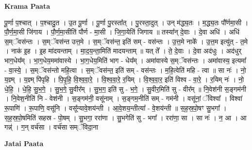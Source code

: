 \documentclass[17pt]{extarticle}
\begin{document}
\textbf{Krama Paata} \newline

पू॒र्णा प॒श्चात् । प॒श्चादु॒त । उ॒त पू॒र्णा । पू॒र्णा पु॒रस्ता᳚त् । पु॒रस्ता॒दुत् । उन् म॑द्ध्य॒तः । म॒द्ध्य॒तः पौ᳚र्णमा॒सी । पौ॒र्ण॒मा॒सी जि॑गाय । पौ॒र्ण॒मा॒सीति॑ पौर्ण - मा॒सी । जि॒गा॒येति॑ जिगाय ॥ तस्या᳚न् दे॒वाः । दे॒वा अधि॑ । अधि॑ स॒म्ॅवस॑न्तः । स॒म्ॅवस॑न्त उत्त॒मे । स॒म्ॅवस॑न्त॒ इति॑ सम् - वस॑न्तः । उ॒त्त॒मे नाके᳚ । उ॒त्त॒म इत्यु॑त् - त॒मे । नाक॑ इ॒ह । इ॒ह मा॑दयन्ताम् । मा॒द॒य॒न्ता॒मिति॑ मादयन्ताम् ॥ यत् ते᳚ । ते॒ दे॒वाः । दे॒वा अद॑धुः । अद॑धुर् भाग॒धेय᳚म् । भा॒ग॒धेय॒ममा॑वास्ये । भा॒ग॒धेय॒मिति॑ भाग - धेय᳚म् । अमा॑वास्ये स॒म्ॅवस॑न्तः । अमा॑वास्य॒ इत्यमा᳚ - वा॒स्ये॒ । स॒म्ॅवस॑न्तो महि॒त्वा । स॒म्ॅवस॑न्त॒ इति॑ सम् - वस॑न्तः । म॒हि॒त्वेति॑ महि - त्वा ॥ सा नः॑ । नो॒ य॒ज्ञ्म् । य॒ज्ञ्म् पि॑पृहि । पि॒पृ॒हि॒ वि॒श्व॒वा॒रे॒ । वि॒श्व॒वा॒रे॒ र॒यिम् । वि॒श्व॒वा॒र॒ इति॑ विश्व - वा॒रे॒ । र॒यिम् नः॑ । नो॒ धे॒हि॒ । धे॒हि॒ सु॒भ॒गे॒ । सु॒भ॒गे॒ सु॒वीर᳚म् । सु॒भ॒ग॒ इति॑ सु - भ॒गे॒ । सु॒वीर॒मिति॑ सु - वीर᳚म् ॥ नि॒वेश॑नी स॒ङ्गम॑नी । नि॒वेश॒नीति॑ नि - वेश॑नी । स॒ङ्गम॑नी॒ वसू॑नाम् । स॒ङ्गम॒नीति॑ सम् - गम॑नी । वसू॑नां॒ ॅविश्वा᳚ । विश्वा॑ रू॒पाणि॑ । रू॒पाणि॒ वसू॑नि । वसू᳚न्यावे॒शय॑न्ती । आ॒वे॒शय॒न्तीत्या᳚ - वे॒शय॑न्ती ॥ स॒ह॒स्र॒पो॒षꣳ सु॒भगा᳚ । स॒ह॒स्र॒पो॒षमिति॑ सहस्र - पो॒षम् । सु॒भगा॒ ररा॑णा । सु॒भगेति॑ सु - भगा᳚ । ररा॑णा॒ सा । सा नः॑ । न॒ आ । आ गन्न्॑ । ग॒न् वर्च॑सा । वर्च॑सा सम्ॅविदा॒ना \newline

\textbf{Jatai Paata} \newline
\end{document}
